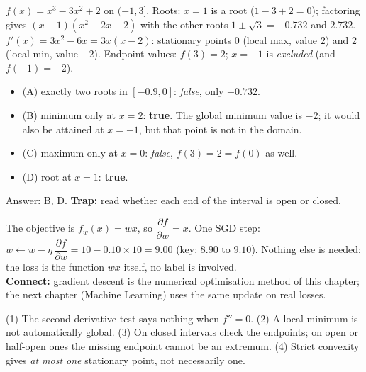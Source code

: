 \documentclass[11pt,a4paper]{article}
\begin{document}
\begin{example}
$f(x)=x^3-3x^2+2$ on $(-1,3]$. Roots: $x=1$ is a root ($1-3+2=0$); factoring gives $(x-1)(x^2-2x-2)$ with the other roots $1\pm\sqrt3=-0.732$ and $2.732$. $f'(x)=3x^2-6x=3x(x-2)$: stationary points $0$ (local max, value $2$) and $2$ (local min, value $-2$). Endpoint values: $f(3)=2$; $x=-1$ is \emph{excluded} (and $f(-1)=-2$).
\begin{itemize}[noitemsep]
\item (A) exactly two roots in $[-0.9,0]$: \emph{false}, only $-0.732$.
\item (B) minimum only at $x=2$: \textbf{true}. The global minimum value is $-2$; it would also be attained at $x=-1$, but that point is not in the domain.
\item (C) maximum only at $x=0$: \emph{false}, $f(3)=2=f(0)$ as well.
\item (D) root at $x=1$: \textbf{true}.
\end{itemize}
Answer: B, D. \textbf{Trap:} read whether each end of the interval is open or closed.
\end{example}

\begin{example}
The objective is $f_w(x)=wx$, so $\dfrac{\partial f}{\partial w}=x$. One SGD step: $w\leftarrow w-\eta\,\dfrac{\partial f}{\partial w}=10-0.10\times10=\mathbf{9.00}$ (key: $8.90$ to $9.10$). Nothing else is needed: the loss is the function $wx$ itself, no label is involved.\\
\textbf{Connect:} gradient descent is the numerical optimisation method of this chapter; the next chapter (Machine Learning) uses the same update on real losses.
\end{example}

\begin{trap}
(1) The second-derivative test says nothing when $f''=0$. (2) A local minimum is not automatically global. (3) On closed intervals check the endpoints; on open or half-open ones the missing endpoint cannot be an extremum. (4) Strict convexity gives \emph{at most one} stationary point, not necessarily one.
\end{trap}

\end{document}

